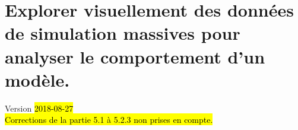 \chapter{Explorer visuellement des données de simulation massives pour analyser le comportement d'un modèle.}
\begin{center}
	{\large Version \hl{2018-08-27}}\\
	\hl{Corrections de la partie 5.1 à 5.2.3 non prises en compte.}

\end{center}
\minitoc

\clearpage

%
%
%
%
%
%
